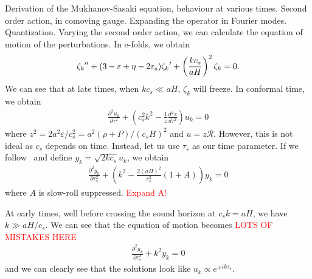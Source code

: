     Derivation of the Mukhanov-Sasaki equation, behaviour at various times.
    Second order action, in comoving gauge.
    Expanding the operator in Fourier modes.
    Quantization.
    Varying the second order action, we can calculate the equation of motion
    of the perturbations.
    In e-folds, we obtain
    \begin{align}\label{modefneqn_zeta_N}
        {\zeta_k}'' + (3-\varepsilon+\eta-2\varepsilon_{s}){\zeta_k}'+\left(\frac{kc_s}{aH}\right)^2\zeta_k=0.
    \end{align}
    We can see that at late times, when $kc_s\ll aH$, $\zeta_k$ will freeze.
    In conformal time, we obtain
    \begin{align}\label{modefneqn_tau}
        \frac{\partial^2 u_k}{\partial \tau^2} + \left(c_s^2k^2 - \frac{1}{z}\frac{d^2 z}{d \tau^2}\right)u_k = 0
    \end{align}
    where $z^2 = 2a^2\varepsilon/c_s^2 = a^2\left(\rho+P\right)/\left(c_sH\right)^2$ and $u=z\mathcal{R}$.
    However, this is not ideal as $c_s$ depends on time.
    Instead, let us use $\tau_s$ as our time parameter.
    If we follow~\cite{Hu_2011} and define $y_k=\sqrt{2kc_s}u_k$,
    we obtain
    \begin{align}\label{modefneqn_tau_s}
        \frac{\partial^2 y_k}{\partial \tau_s^2} + \left(k^2 - \frac{2\left(aH\right)^2}{c_s^2}(1+A)\right)y_k = 0
    \end{align}
    where $A$ is slow-roll suppressed. \textcolor{red}{Expand A!}


    At early times, well before crossing the sound horizon at $c_sk=aH$,
    we have $k\gg aH/c_s$. We can see that the equation of motion becomes
    \textcolor{red}{LOTS OF MISTAKES HERE}
    \begin{align}
        \frac{\partial^2 y_k}{\partial \tau_s^2} + k^2 y_k = 0
    \end{align}
    and we can clearly see that the solutions look like $u_k\propto e^{\pm ik\tau_s}$.


